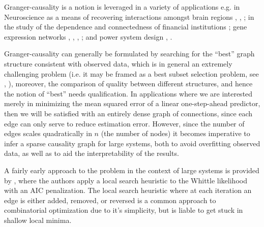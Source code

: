 \documentclass[12pt]{article}
\begin{document}
Granger-causality is a notion is leveraged in a variety of
applications e.g. in Neuroscience as a means of recovering
interactions amongst brain regions \cite{bressler2011wiener},
\cite{anna_paper2008}, \cite{david2008identifying}; in the study of
the dependence and connectedness of financial institutions
\cite{NBERw16223}; gene expression networks \cite{Fujita2007},
\cite{methods_for_inferring_gene_regulatory_networks_from_time_series_expression_data},
\cite{grouped_graphical_granger_modelling_for_gene_expression_regulatory_networks_discovery},
\cite{discovering_graphical_Granger_causality_using_the_truncating_lasso_penalty};
and power system design \cite{Misyrlis2016450}, \cite{yuan2014root}.

Granger-causality can generally be formulated by searching for the
``best'' graph structure consistent with observed data, which is in
general an extremely challenging problem (i.e. it may be framed as a
best subset selection problem, see \cite{bss_mio},
\cite{hastie_bss_comp}), moreover, the comparison of quality between
different structures, and hence the notion of ``best'' needs
qualification.  In applications where we are interested merely in
minimizing the mean squared error of a linear one-step-ahead
predictor, then we will be satisfied with an entirely dense graph of
connections, since each edge can only serve to reduce estimation
error.  However, since the number of edges scales quadratically in $n$
(the number of nodes) it becomes imperative to infer a sparse
causality graph for large systems, both to avoid overfitting observed
data, as well as to aid the interpretability of the results.

A fairly early approach to the problem in the context of large systems
is provided by \cite{bach2004learning}, where the authors apply a
local search heuristic to the Whittle likelihood with an AIC
penalization.  The local search heuristic where at each iteration an
edge is either added, removed, or reversed is a common approach to
combinatorial optimization due to it's simplicity, but is liable to
get stuck in shallow local minima.
\end{document}
